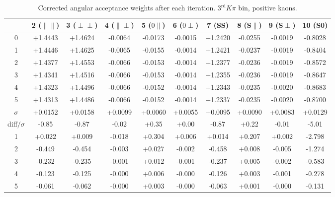 \begin{table}[h!]
    \center\footnotesize
 \caption{\small Corrected angular acceptance weights after each iteration. $3^{\text{rd}}K\pi$ bin, positive kaons. } 
     \begin{tabular}{c c c c c c c c c c}
           &  2 ($\parallel\parallel$) & 3 ($\perp\perp$) & 4 ($\parallel\perp$) & 5 ($0\parallel$) & 
            6 ($0\perp$) & 7 (SS) & 8 (S$\parallel$) & 9 (S$\perp$) & 10 (S0) \\
        \hline
      0 & +1.4443 & +1.4624 & -0.0064 & -0.0173 & -0.0015 & +1.2420 & -0.0255 & -0.0019 & -0.8028\\
      1 & +1.4446 & +1.4625 & -0.0065 & -0.0155 & -0.0014 & +1.2421 & -0.0237 & -0.0019 & -0.8404\\
      2 & +1.4377 & +1.4553 & -0.0066 & -0.0153 & -0.0014 & +1.2377 & -0.0236 & -0.0019 & -0.8572\\
      3 & +1.4341 & +1.4516 & -0.0066 & -0.0153 & -0.0014 & +1.2355 & -0.0236 & -0.0019 & -0.8647\\
      4 & +1.4323 & +1.4496 & -0.0066 & -0.0152 & -0.0014 & +1.2343 & -0.0235 & -0.0020 & -0.8683\\
      5 & +1.4313 & +1.4486 & -0.0066 & -0.0152 & -0.0014 & +1.2337 & -0.0235 & -0.0020 & -0.8700\\
     \hline
      $\sigma$ & +0.0152 & +0.0158 & +0.0099 & +0.0060 & +0.0055 & +0.0095 & +0.0090 & +0.0083 & +0.0129\\
     diff$/\sigma$& -0.85  & -0.87  & -0.02  & +0.35  & +0.00  & -0.87  & +0.22  & -0.01  & -5.01 \\
      \hline
      1 & +0.022  & +0.009  & -0.018  & +0.304  & +0.006  & +0.014  & +0.207  & +0.002  & -2.798 \\
      2 & -0.449  & -0.454  & -0.003  & +0.027  & -0.002  & -0.458  & +0.008  & -0.005  & -1.274 \\
      3 & -0.232  & -0.235  & -0.001  & +0.012  & -0.001  & -0.237  & +0.005  & -0.002  & -0.583 \\
      4 & -0.123  & -0.125  & -0.000  & +0.006  & -0.000  & -0.126  & +0.003  & -0.001  & -0.278 \\
      5 & -0.061  & -0.062  & -0.000  & +0.003  & -0.000  & -0.063  & +0.001  & -0.000  & -0.131 \\
     \end{tabular}
     \label{tab:norm_weights_evolution_3}
\end{table}
